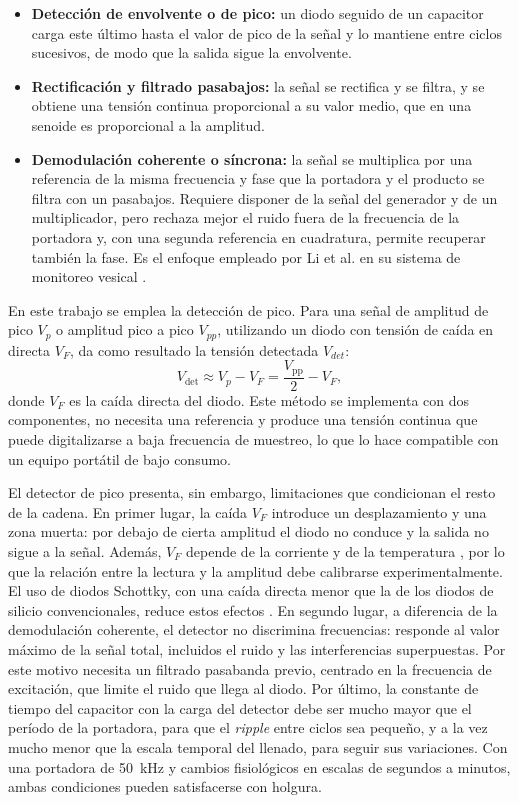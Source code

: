 \documentclass[12pt,a4paper]{article}
\begin{document}
\begin{itemize}
    \item \textbf{Detección de envolvente o de pico:} un diodo seguido de un capacitor carga este
    último hasta el valor de pico de la señal y lo mantiene entre ciclos sucesivos, de modo que la
    salida sigue la envolvente.
    \item \textbf{Rectificación y filtrado pasabajos:} la señal se rectifica y se filtra, y se obtiene
    una tensión continua proporcional a su valor medio, que en una senoide es proporcional a la
    amplitud.
    \item \textbf{Demodulación coherente o síncrona:} la señal se multiplica por una referencia de la
    misma frecuencia y fase que la portadora y el producto se filtra con un pasabajos. Requiere
    disponer de la señal del generador y de un multiplicador, pero rechaza mejor el ruido fuera de
    la frecuencia de la portadora y, con una segunda referencia en cuadratura, permite recuperar
    también la fase. Es el enfoque empleado por Li et al. en su sistema de monitoreo vesical
    \cite{li2013monitoring}.
\end{itemize}

En este trabajo se emplea la detección de pico. Para una señal de amplitud de pico $V_p$ o amplitud pico a 
pico $V_{pp}$, utilizando un diodo con tensión de caída en directa $V_F$, da como resultado la tensión detectada
$V_{det}$:
\begin{equation}
    V_{\mathrm{det}}\approx V_p-V_F=\frac{V_{\mathrm{pp}}}{2}-V_F,
\end{equation}
donde $V_F$ es la caída directa del diodo. Este método se implementa con dos componentes, no necesita
una referencia y produce una tensión continua que puede digitalizarse a baja frecuencia de muestreo,
lo que lo hace compatible con un equipo portátil de bajo consumo.

El detector de pico presenta, sin embargo, limitaciones que condicionan el resto de la cadena. En
primer lugar, la caída $V_F$ introduce un desplazamiento y una zona muerta: por debajo de cierta
amplitud el diodo no conduce y la salida no sigue a la señal. Además, $V_F$ depende de la corriente y
de la temperatura \cite{nexperia_bat54s}, por lo que la relación entre la lectura y la amplitud debe
calibrarse experimentalmente. El uso de diodos Schottky, con una caída directa menor que la de los
diodos de silicio convencionales, reduce estos efectos \cite{nexperia_bat54s}. En segundo lugar, a
diferencia de la demodulación coherente, el detector no discrimina frecuencias: responde al valor
máximo de la señal total, incluidos el ruido y las interferencias superpuestas. Por este motivo
necesita un filtrado pasabanda previo, centrado en la frecuencia de excitación, que limite el ruido
que llega al diodo. Por último, la constante de tiempo del capacitor con la carga del detector debe
ser mucho mayor que el período de la portadora, para que el \textit{ripple} entre ciclos sea pequeño, y
a la vez mucho menor que la escala temporal del llenado, para seguir sus variaciones. Con una
portadora de 50~kHz y cambios fisiológicos en escalas de segundos a minutos, ambas condiciones pueden
satisfacerse con holgura.
\end{document}
